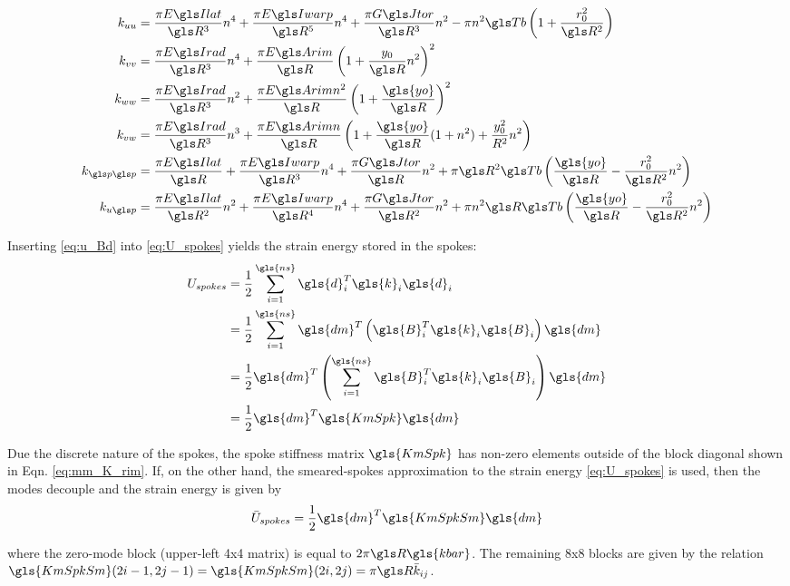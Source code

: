 \documentclass[\rootdir/thesis.tex]{subfiles}
\begin{document}
\begin{align*}
k_{uu} &= \frac{\pi \EIl}{\R^3}n^4 + \frac{\pi \EIw}{\R^5}n^4 + \frac{\pi \GJ}{\R^3}n^2 - \pi n^2 \Tb\left(1 + \frac{r_0^2}{\R^2}\right)\\
k_{vv} &= \frac{\pi \EIr}{\R^3}n^4 + \frac{\pi \EA}{\R}\left(1 + \frac{y_0}{\R}n^2 \right)^2\\
k_{ww} &= \frac{\pi \EIr}{\R^3}n^2 + \frac{\pi \EA n^2}{\R}\left(1 + \frac{\gls{yo}}{\R} \right)^2\\
k_{vw} &= \frac{\pi \EIr}{\R^3}n^3 + \frac{\pi \EA n}{\R}\left(1 + \frac{\gls{yo}}{\R}(1+n^2) + \frac{y_0^2}{R^2}n^2\right)\\
k_{\p\p} &= \frac{\pi \EIl}{\R} + \frac{\pi \EIw}{\R^3}n^4 + \frac{\pi \GJ}{\R}n^2 + \pi \R^2\Tb\left(\frac{\gls{yo}}{\R} - \frac{r_0^2}{\R^2}n^2\right)\\
k_{u\p} &= \frac{\pi \EIl}{\R^2}n^2 + \frac{\pi \EIw}{\R^4}n^4 + \frac{\pi \GJ}{\R^2}n^2 + \pi n^2 \R \Tb\left(\frac{\gls{yo}}{\R} - \frac{r_0^2}{\R^2}n^2\right)
\end{align*}

Inserting \eqref{eq:u_Bd} into \eqref{eq:U_spokes} yields the strain energy stored in the spokes:
\begin{align}
\label{eq:mm_U_spokes}
\begin{split}
U_{spokes} &= \frac{1}{2} \sum_{i=1}^{\gls{ns}} \gls{d}_i^T \gls{k}_i \gls{d}_i\\
&= \frac{1}{2} \sum_{i=1}^{\gls{ns}} \gls{dm}^T \left(\gls{B}_i^T \gls{k}_i \gls{B}_i \right)\gls{dm}\\
&= \frac{1}{2} \gls{dm}^T \left(\sum_{i=1}^{\gls{ns}} \gls{B}_i^T \gls{k}_i \gls{B}_i \right) \gls{dm}\\
&= \frac{1}{2} \gls{dm}^T \gls{KmSpk} \gls{dm}
\end{split}
\end{align}

Due the discrete nature of the spokes, the spoke stiffness matrix $\gls{KmSpk}$ has non-zero elements outside of the block diagonal shown in Eqn. \eqref{eq:mm_K_rim}. If, on the other hand, the smeared-spokes approximation to the strain energy \eqref{eq:U_spokes} is used, then the modes decouple and the strain energy is given by
\begin{equation}
\label{eq:U_spokes_smeared}
\bar{U}_{spokes} = \frac{1}{2} \gls{dm}^T \gls{KmSpkSm} \gls{dm}
\end{equation}

where the zero-mode block (upper-left 4x4 matrix) is equal to $2\pi \R\gls{kbar}$. The remaining 8x8 blocks are given by the relation $\gls{KmSpkSm}(2i-1, 2j-1) = \gls{KmSpkSm}(2i, 2j) = \pi \R \bar{k}_{ij}$.
\end{document}
